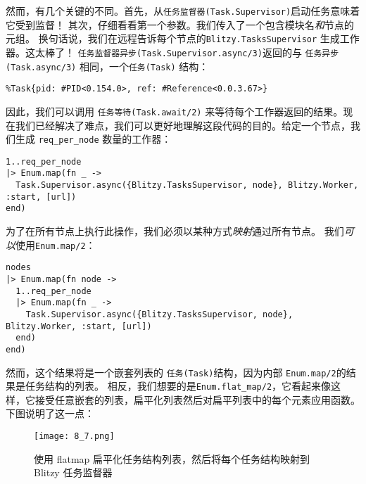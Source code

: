 然而，有几个关键的不同。首先，从\texttt{任务监督器(Task.Supervisor)}启动任务意味着它受到监督！
其次，仔细看看第一个参数。我们传入了一个包含模块名\emph{和}节点的元组。
换句话说，我们在远程告诉每个节点的\texttt{Blitzy.TasksSupervisor} 生成工作器。这太棒了！
\texttt{任务监督器异步(Task.Supervisor.async/3)}返回的与 \texttt{任务异步(Task.async/3)} 相同，一个\texttt{任务(Task)} 结构：

\begin{code}{}
\begin{verbatim}
%Task{pid: #PID<0.154.0>, ref: #Reference<0.0.3.67>}
\end{verbatim}
\end{code}

因此，我们可以调用 \texttt{任务等待(Task.await/2)}
来等待每个工作器返回的结果。现在我们已经解决了难点，我们可以更好地理解这段代码的目的。给定一个节点，我们生成
\texttt{req\_per\_node} 数量的工作器：

\begin{code}{}
\begin{verbatim}
1..req_per_node
|> Enum.map(fn _ ->
  Task.Supervisor.async({Blitzy.TasksSupervisor, node}, Blitzy.Worker, :start, [url])
end)
\end{verbatim}
\end{code}

为了在所有节点上执行此操作，我们必须以某种方式\emph{映射}通过所有节点。
我们\emph{可以}使用\texttt{Enum.map/2}：

\begin{code}{}
\begin{verbatim}
nodes
|> Enum.map(fn node ->
  1..req_per_node
  |> Enum.map(fn _ ->
    Task.Supervisor.async({Blitzy.TasksSupervisor, node}, Blitzy.Worker, :start, [url])
  end)
end)
\end{verbatim}
\end{code}

然而，这个结果将是一个嵌套列表的 \texttt{任务(Task)}结构，因为内部 \texttt{Enum.map/2}的结果是任务结构的列表。
相反，我们想要的是\texttt{Enum.flat\_map/2}，它看起来像这样，它接受任意嵌套的列表，扁平化列表然后对扁平列表中的每个元素应用函数。
下图说明了这一点：

\begin{figure}[!ht]
    \centering
    \texttt{[image: 8\_7.png]}
    \caption{使用 flatmap 扁平化任务结构列表，然后将每个任务结构映射到Blitzy 任务监督器}
    \label{fig:8_7}
\end{figure}

